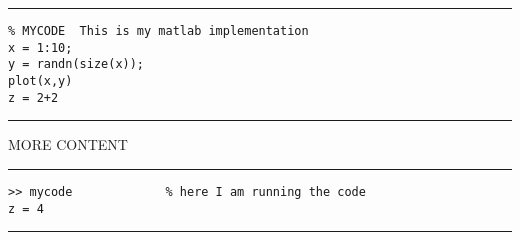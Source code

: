 
\bigskip
\hrule
\begin{verbatim}
% MYCODE  This is my matlab implementation
x = 1:10;
y = randn(size(x));
plot(x,y)
z = 2+2
\end{verbatim}
\hrule
\bigskip

MORE CONTENT

\bigskip
\hrule
\begin{verbatim}
>> mycode             % here I am running the code
z = 4
\end{verbatim}
\hrule